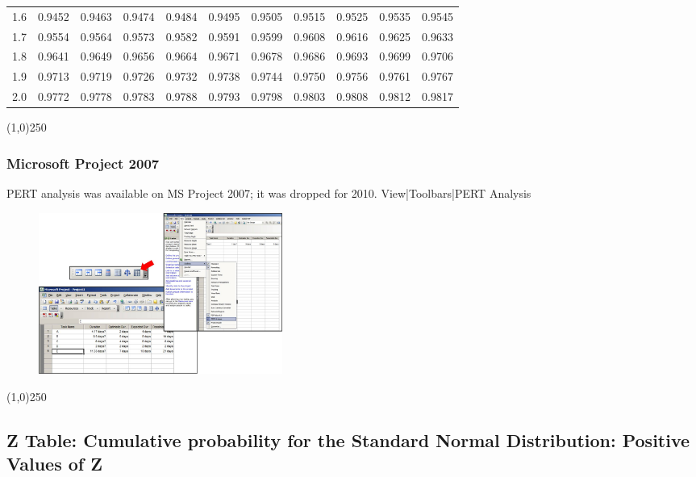 \begin{frame}
\begin{table}
{\begin{tabular}{|c|c|c|c|c|c|c|c|c|c|c|}
1.6	&	0.9452	&	0.9463	&	0.9474	&	0.9484	&	0.9495	&	0.9505	&	0.9515	&	0.9525	&	0.9535	&	0.9545	\\
1.7	&	0.9554	&	0.9564	&	0.9573	&	0.9582	&	0.9591	&	0.9599	&	0.9608	&	0.9616	&	0.9625	&	0.9633	\\
1.8	&	0.9641	&	0.9649	&	0.9656	&	0.9664	&	0.9671	&	0.9678	&	0.9686	&	0.9693	&	0.9699	&	0.9706	\\
1.9	&	0.9713	&	0.9719	&	0.9726	&	0.9732	&	0.9738	&	0.9744	&	0.9750	&	0.9756	&	0.9761	&	0.9767	\\
2.0	&	0.9772	&	0.9778	&	0.9783	&	0.9788	&	0.9793	&	0.9798	&	0.9803	&	0.9808	&	0.9812	&	0.9817	\\
\hline	
\end{tabular}}
\end{table}
\end{frame}
\begin{center}\line(1,0){250}\end{center}



\begin{frame}
\frametitle{Microsoft Project 2007}
PERT analysis was available on MS Project 2007; it was dropped for 2010.
View|Toolbars|PERT Analysis

\begin{figure}
	\centering
		\includegraphics[width = 8cm]{images/PERTproj.jpg}
	\label{fig:PERTproj}
\end{figure}

\end{frame}
\begin{center}\line(1,0){250}\end{center}

\subsection{Z Table: Cumulative probability for the Standard Normal Distribution: Positive Values of Z}

